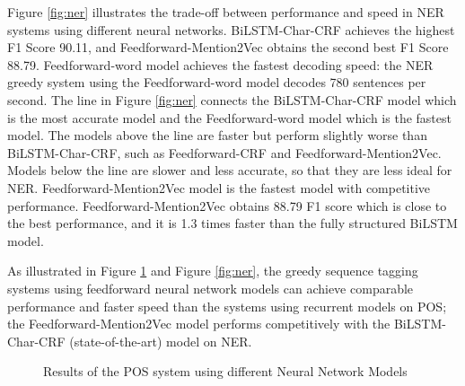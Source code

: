 \documentclass{sfuthesis}
\begin{document}
Figure \ref{fig:ner} illustrates the trade-off between performance and speed in NER systems using different neural networks. BiLSTM-Char-CRF achieves the highest F1 Score 90.11, and Feedforward-Mention2Vec obtains the second best F1 Score 88.79. Feedforward-word model achieves the fastest decoding speed: the NER greedy system using the Feedforward-word model decodes 780 sentences per second. The line in Figure \ref{fig:ner} connects the BiLSTM-Char-CRF model which is the most accurate model and the Feedforward-word model which is the fastest model. The models above the line are faster but perform slightly worse than BiLSTM-Char-CRF, such as Feedforward-CRF and Feedforward-Mention2Vec. Models below the line are slower and less accurate, so that they are less ideal for NER. Feedforward-Mention2Vec model is the fastest model with competitive performance. Feedforward-Mention2Vec obtains 88.79 F1 score which is close to the best performance, and it is 1.3 times faster than the fully structured BiLSTM model.

As illustrated in Figure \ref{fig:pos} and Figure \ref{fig:ner}, the greedy sequence tagging systems using feedforward neural network models can achieve comparable performance and faster speed than the systems using recurrent models on POS; the Feedforward-Mention2Vec model performs competitively with the BiLSTM-Char-CRF (state-of-the-art) model on NER.

\begin{figure}
 \caption{Results of the POS system using different Neural Network Models}
  \label{fig:pos}
\end{figure}
\end{document}
